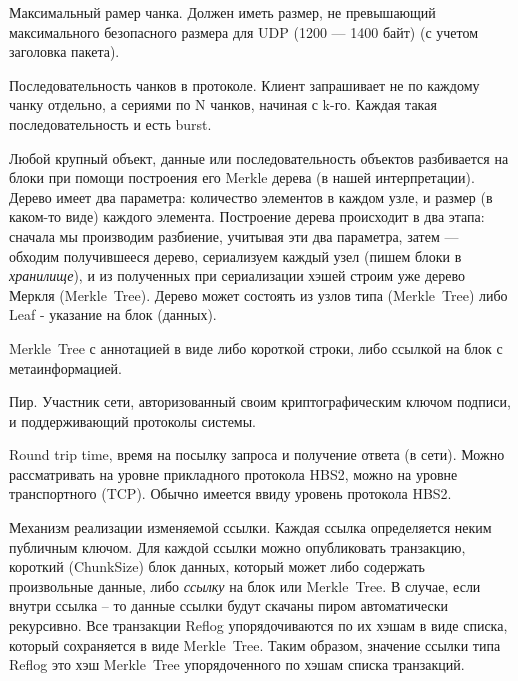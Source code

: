 \documentclass[11pt,a4paper]{article}
\begin{document}
\begin{description}[itemsep=10pt]
  \item[ChunkSize] Максимальный рамер чанка. Должен иметь размер, не превышающий
                   максимального безопасного размера для UDP (1200 --- 1400
                   байт) (с учетом заголовка пакета).

  \item[Burst] Последовательность чанков в протоколе. Клиент запрашивает не по каждому чанку
               отдельно, а сериями по N чанков, начиная с k-го. Каждая такая последовательность
               и есть burst.

  \item[Merkle~Tree] Любой крупный объект, данные или последовательность объектов
                     разбивается на блоки при помощи построения его Merkle дерева
                     (в нашей интерпретации). Дерево имеет два параметра:
                     количество элементов в каждом узле, и размер (в каком-то виде) каждого
                     элемента. Построение дерева происходит в два этапа: сначала мы производим
                     разбиение, учитывая эти два параметра, затем --- обходим получившееся дерево,
                     сериализуем каждый узел (пишем блоки в \textit{хранилище}), и из полученных
                     при сериализации хэшей строим уже дерево Меркля (Merkle~Tree).
                     Дерево может состоять из узлов типа (Merkle~Tree) либо Leaf
                     - указание на блок (данных).

  \item[Annotated~Merkle~Tree] Merkle~Tree с аннотацией в виде либо короткой
    строки, либо ссылкой на блок с метаинформацией.

  \item[Peer] Пир. Участник сети, авторизованный своим криптографическим ключом
              подписи, и поддерживающий протоколы системы.

  \item[RTT] Round trip time, время на посылку запроса и получение
    ответа (в сети). Можно рассматривать на уровне прикладного протокола HBS2,
    можно на уровне транспортного (TCP). Обычно имеется ввиду уровень протокола
    HBS2.

  \item[Reflog] Механизм реализации изменяемой ссылки. Каждая ссылка
    определяется неким публичным ключом. Для каждой ссылки можно опубликовать
    транзакцию, короткий (ChunkSize) блок  данных, который может либо содержать
    произвольные данные, либо \textit{ссылку} на блок или Merkle~Tree. В случае,
    если внутри ссылка -- то данные ссылки будут скачаны пиром автоматически
    рекурсивно. Все транзакции Reflog упорядочиваются по их хэшам в виде списка,
    который сохраняется в виде Merkle~Tree. Таким образом, значение ссылки типа
    Reflog это хэш Merkle~Tree упорядоченного по хэшам списка транзакций.

\end{description}
\end{document}
